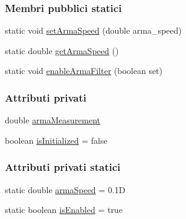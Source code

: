 \subsubsection*{Membri pubblici statici}
\begin{DoxyCompactItemize}
\item 
static void \hyperlink{classit_1_1unibo_1_1torsello_1_1bluetoothpositioning_1_1filters_1_1MyArmaRssiFilter_aba1608e8dede3a85c42c084ac6326851_aba1608e8dede3a85c42c084ac6326851}{set\+Arma\+Speed} (double arma\+\_\+speed)
\item 
static double \hyperlink{classit_1_1unibo_1_1torsello_1_1bluetoothpositioning_1_1filters_1_1MyArmaRssiFilter_ac6eda6fc101dc89f3497c0ba8991658b_ac6eda6fc101dc89f3497c0ba8991658b}{get\+Arma\+Speed} ()
\item 
static void \hyperlink{classit_1_1unibo_1_1torsello_1_1bluetoothpositioning_1_1filters_1_1MyArmaRssiFilter_a36d7f50fdd722fe01bf86f21246d4151_a36d7f50fdd722fe01bf86f21246d4151}{enable\+Arma\+Filter} (boolean set)
\end{DoxyCompactItemize}
\subsubsection*{Attributi privati}
\begin{DoxyCompactItemize}
\item 
double \hyperlink{classit_1_1unibo_1_1torsello_1_1bluetoothpositioning_1_1filters_1_1MyArmaRssiFilter_ac386c808d409a1e6fc68801a3c2cf4b9_ac386c808d409a1e6fc68801a3c2cf4b9}{arma\+Measurement}
\item 
boolean \hyperlink{classit_1_1unibo_1_1torsello_1_1bluetoothpositioning_1_1filters_1_1MyArmaRssiFilter_a77ff83671b040ea636a1bb939803450b_a77ff83671b040ea636a1bb939803450b}{is\+Initialized} = false
\end{DoxyCompactItemize}
\subsubsection*{Attributi privati statici}
\begin{DoxyCompactItemize}
\item 
static double \hyperlink{classit_1_1unibo_1_1torsello_1_1bluetoothpositioning_1_1filters_1_1MyArmaRssiFilter_a55fe96a8f80f6ec634e4f9f9e2e337f8_a55fe96a8f80f6ec634e4f9f9e2e337f8}{arma\+Speed} = 0.\+1D
\item 
static boolean \hyperlink{classit_1_1unibo_1_1torsello_1_1bluetoothpositioning_1_1filters_1_1MyArmaRssiFilter_abff3147d8a5700ce103cd355d7b2b7d7_abff3147d8a5700ce103cd355d7b2b7d7}{is\+Enabled} = true
\end{DoxyCompactItemize}


